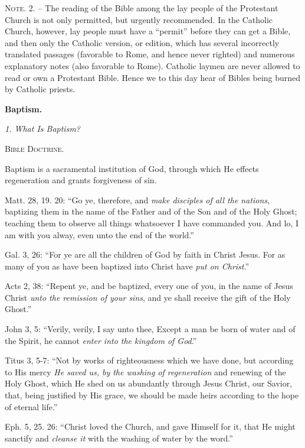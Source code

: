 \documentclass[
]{book}
\begin{document}
\textsc{Note. 2. --} The reading of the Bible among the lay people of the Protestant Church is not only permitted, but urgently recommended. In the Catholic Church, however, lay people must have a ``permit'' before they can get a Bible, and then only the Catholic version, or edition, which has several incorrectly translated passages (favorable to Rome, and hence never righted) and numerous explanatory notes (also favorable to Rome). Catholic laymen are never allowed to read or own a Protestant Bible. Hence we to this day hear of Bibles being burned by Catholic priests.

\begin{center}
\textbf{Baptism.}

\textsl{1.  What Is Baptism?}

\textsc{Bible Doctrine.}
\end{center}

Baptism is a sacramental institution of God, through which He effects regeneration and grants forgiveness of sin.

Matt. 28, 19. 20: ``Go ye, therefore, and \emph{make disciples of all the nations}, baptizing them in the name of the Father and of the Son and of the Holy Ghost; teaching them to observe all things whatsoever I have commanded you. And lo, I am with you alway, even unto the end of the world.''

Gal. 3, 26: ``For ye are all the children of God by faith in Christ Jesus. For as many of you as have been baptized into Christ have \emph{put on Christ}.''

Acts 2, 38: ``Repent ye, and be baptized, every one of you, in the name of Jesus Christ \emph{unto the remission of your sins}, and ye shall receive the gift of the Holy Ghost.''

John 3, 5: ``Verily, verily, I say unto thee, Except a man be born of water and of the Spirit, he cannot \emph{enter into the kingdom of God}.''

Titus 3, 5-7: ``Not by works of righteousness which we have done, but according to His mercy \emph{He saved us, by the washing of regeneration} and renewing of the Holy Ghost, which He shed on us abundantly through Jesus Christ, our Savior, that, being justified by His grace, we should be made heirs according to the hope of eternal life.''

Eph. 5, 25. 26: ``Christ loved the Church, and gave Himself for it, that He might sanctify and \emph{cleanse it} with the washing of water by the word.''
\end{document}
